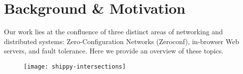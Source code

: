 \section{Background \& Motivation}
\label{sec:background}

Our work lies at the confluence of three distinct areas of networking and distributed systems: Zero-Configuration Networks (Zeroconf), in-browser Web servers, and fault tolerance.
Here we provide an overview of these topics.

\begin{figure}[h]
      \centering
      \texttt{[image: shippy-intersections]}
      \label{fig:stack}
\end{figure}







%

